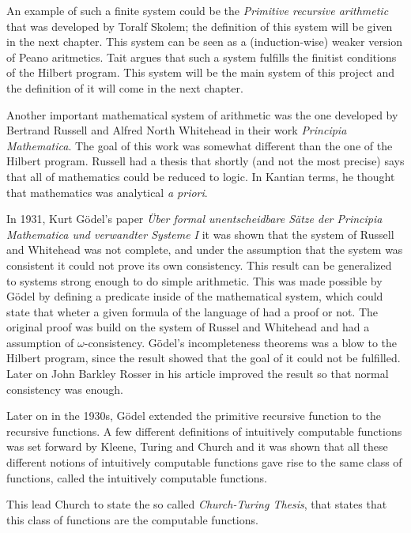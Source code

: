 \documentclass[../main.tex]{subfiles}
\begin{document}
An example of such a finite system could be the \textit{Primitive recursive
arithmetic} that was developed by Toralf Skolem; the definition of this system
will be given in the next chapter. This system can be seen as a
(induction-wise) weaker version of Peano aritmetics. Tait  argues
that such a system fulfills the finitist conditions of the Hilbert program.
This system will be the main system of this project and the definition of it
will come in the next chapter.

Another  important mathematical system of arithmetic was
the one developed by Bertrand Russell and Alfred North Whitehead in their work
\textit{Principia Mathematica}. The goal of this work was somewhat different
than the one of the Hilbert program. Russell had a thesis that shortly (and not
the most precise) says that all of mathematics could be reduced to logic. In
Kantian terms, he thought that mathematics was analytical \textit{a priori}. 

In 1931, Kurt Gödel's paper \textit{Über formal unentscheidbare Sätze der
Principia Mathematica und verwandter Systeme I} it was shown  that the system of
Russell and Whitehead was not complete, and under the assumption that the
system was consistent it could not prove its own consistency.
This result can be generalized to systems strong enough to do simple
arithmetic. This was made possible by Gödel by defining a predicate inside of
the mathematical system, which could state that wheter a given formula of the
language of had a proof or not.
The
original proof was build on the system of Russel and Whitehead and had a
assumption of $\omega$-consistency. Gödel's incompleteness theorems
was a blow to the Hilbert program, since the result showed that the goal of it
could not be fulfilled. Later on John Barkley Rosser in his article
\parencite{Ross1936} improved the
result so that normal  consistency was enough.



Later on in the 1930s, Gödel extended the primitive recursive function to the  recursive
functions. A few different definitions of intuitively computable functions was
set forward by Kleene, Turing and Church and it was shown that all these
different notions of intuitively computable functions gave rise to the same
class of functions, called the intuitively computable functions.

This lead Church to state the so called \textit{Church-Turing Thesis}, that
states that this class of functions are the computable functions.
\end{document}
